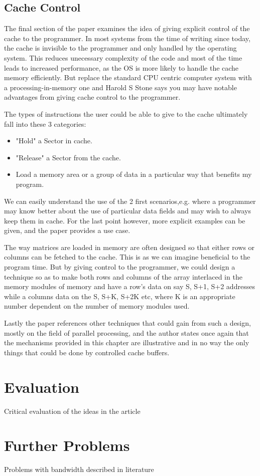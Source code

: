 \documentclass[12pt,twocolumn]{IEEEtran}
\begin{document}
\subsection{Cache Control}
The final section of the paper examines the idea of giving explicit control of the cache to the programmer. In most systems from the time of writing since today, the cache is invisible to the programmer and only handled by the operating system. This reduces unecessary complexity of the code and most of the time leads to increased performance, as the OS is more likely to handle the cache memory efficiently. But replace the standard CPU centric computer system with a processing-in-memory one and Harold S Stone says you may have notable advantages from giving cache control to the programmer.

The types of instructions the user could be able to give to the cache ultimately fall into these 3 categories:
\begin{itemize}
\item{"Hold" a Sector in cache.}
\item{"Release" a Sector from the cache.}
\item{Load a memory area or a group of data in a particular way that benefits my program.}
\end{itemize}

We can easily understand the use of the 2 first scenarios,e.g. where a programmer may know better about the use of particular data fields and may wish to always keep them in cache. For the last point however, more explicit examples can be given, and the paper provides a use case. 

The way matrices are loaded in memory are often designed so that either rows or columns can be fetched to the cache. This is as we can imagine beneficial to the program time. But by giving control to the programmer, we could design a technique so as to make both rows and columns of the array interlaced in the memory modules of memory and have a row's data on say S, S+1, S+2 addresses while a columns data on the S, S+K, S+2K etc, where K is an appropriate number dependent on the number of memory modules used. 

Lastly the paper references other techniques that could gain from such a design, mostly on the field of parallel processing, and the author states once again that the mechanisms provided in this chapter are illustrative and in no way the only things that could be done by controlled cache buffers. 
\section{Evaluation}
Critical evaluation of the ideas in the article
\section{Further Problems}
Problems with bandwidth described in literature



\end{document}
